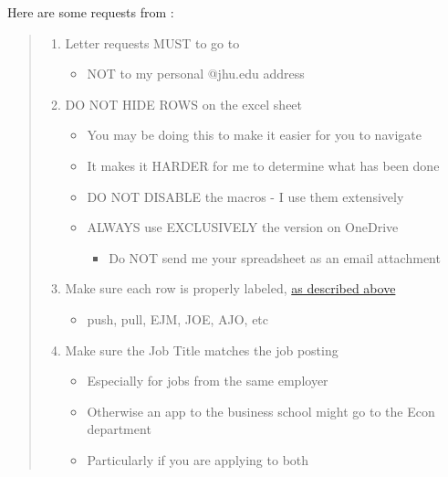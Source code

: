 \documentclass{\econtex}
\begin{document}
\hypertarget{requests-from-jmstaff}{}
Here are some requests from {\JMStaffName}:

\begin{quote}
  \begin{enumerate}
  \item Letter requests MUST to go to \jmstaffemail
    \begin{itemize}
    \item NOT to my personal @jhu.edu address
    \end{itemize}
  \item DO NOT HIDE ROWS on the excel sheet
    \begin{itemize}
    \item You may be doing this to make it easier for you to navigate
    \item It makes it HARDER for me to determine what has been done
    \item DO NOT DISABLE the macros - I use them extensively
    \item ALWAYS use EXCLUSIVELY the version on OneDrive
      \begin{itemize}
      \item Do NOT send me your spreadsheet as an email attachment
      \end{itemize}
    \end{itemize}
  \item Make sure each row is properly labeled, \href{\pageurl/RecLetters/#students-and-staff}{as described above}
    \begin{itemize}
    \item push, pull, EJM, JOE, AJO, etc
    \end{itemize}
  \item Make sure the Job Title matches the job posting
    \begin{itemize}
    \item Especially for jobs from the same employer
    \item Otherwise an app to the business school might go to the Econ department
    \item Particularly if you are applying to both
    \end{itemize}
  \end{enumerate}
\end{quote}

\end{document}

